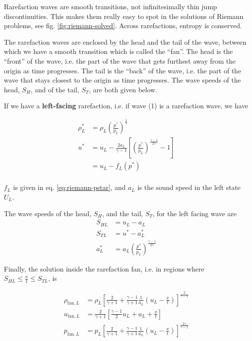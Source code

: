 Rarefaction waves are smooth transitions, not infinitesimally thin jump discontinuities.
This makes them really easy to spot in the solutions of Riemann problems, see fig. \ref{fig:riemann-solved}.
Across rarefactions, entropy is conserved.

The rarefaction waves are enclosed by the head and the tail of the wave, between which we have a smooth transition which is called the ``fan''.
The head is the ``front'' of the wave, i.e. the part of the wave that gets furthest away from the origin as time progresses.
The tail is the ``back'' of the wave, i.e. the part of the wave that stays closest to the origin as time progresses.
The wave speeds of the head, $S_H$, and of the tail, $S_T$, are both given below.


If we have a \textbf{left-facing} rarefaction, i.e. if wave (1) is a rarefaction wave, we have

\begin{align*}
	\rho^*_L &= 
		\rho_L \left( \frac{p^*}{p_L} \right) ^ \frac{1}{\gamma}\\
	u^* &= 
		u_L - \frac{2 a_L}{\gamma - 1} \left[ \left( \frac{p^*}{p_L} \right) ^ \frac{\gamma - 1}{2 \gamma} -1  \right]\\
		& = u_L - f_L(p^*) \\
\end{align*}

$f_{L}$ is given in eq. \ref{eq:riemann-pstar}, and $a_L$ is the sound speed in the left state $U_L$.


The wave speeds of the head, $S_H$, and the tail, $S_T$, for the left facing wave are
\begin{align*}
	S_{HL} &= u_L - a_L\\
	S_{TL} &= u^* - a^*_L\\
	a^*_L  &= a_L \left( \frac{p^*}{p_L} \right) ^ \frac{\gamma - 1}{2 \gamma}
\end{align*}


Finally, the solution inside the rarefaction fan, i.e. in regions where $S_{HL} \leq \frac{x}{t} \leq S_{TL}$, is 

\begin{align}
	\rho_{\text{fan}, L} &= 
		\rho_L \left[ \frac{2}{\gamma + 1} + \frac{\gamma - 1}{\gamma + 1} \frac{1}{a_L} \left(u_L - \frac{x}{t}\right) \right] ^ \frac{2}{\gamma -1 } \label{eq:rho-rarefaction-fan-left}\\
	u_{\text{fan}, L} &= 
		\frac{2}{\gamma + 1} \left[ \frac{\gamma - 1}{2} u_L + a_L + \frac{x}{t}  \right] \\
	p_{\text{fan}, L} &= 
		p_L \left[ \frac{2}{\gamma + 1} + \frac{\gamma - 1}{\gamma + 1} \frac{1}{a_L} \left(u_L - \frac{x}{t}\right) \right] ^ \frac{2 \gamma}{\gamma -1} \label{eq:pressure-rarefaction-fan-left}
\end{align}









